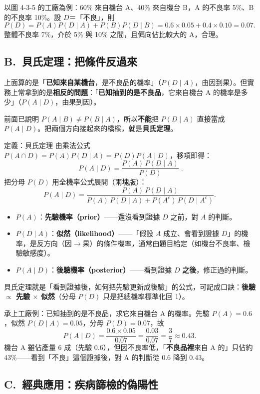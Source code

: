 \documentclass[11pt]{article}
\begin{document}
以圖 4-3-5 的工廠為例：60\% 來自機台 A、40\% 來自機台 B，A 的不良率 5\%、B 的不良率 10\%。設 $D$＝「不良」，則
$$P(D)=P(A)P(D\mid A)+P(B)P(D\mid B)=0.6\times0.05+0.4\times0.10=0.07.$$
整體不良率 7\%，介於 5\% 與 10\% 之間，且偏向佔比較大的 A，合理。

\subsection*{\sffamily B.\ 貝氏定理：把條件反過來}

上面算的是「\textbf{已知來自某機台}，是不良品的機率」（$P(D\mid A)$，由因到果）。但實務上常拿到的是\textbf{相反的問題}：「\textbf{已知抽到的是不良品}，它來自機台 A 的機率是多少」（$P(A\mid D)$，由果到因）。

前面已說明 $P(A\mid B)\neq P(B\mid A)$，所以\textbf{不能}把 $P(D\mid A)$ 直接當成 $P(A\mid D)$。把兩個方向接起來的橋樑，就是\textbf{貝氏定理}。

\begin{補充框}{定義：貝氏定理}
由乘法公式 $P(A\cap D)=P(A)P(D\mid A)=P(D)P(A\mid D)$，移項即得：
$$\boxed{\;P(A\mid D)=\frac{P(A)\,P(D\mid A)}{P(D)}\;}.$$
把分母 $P(D)$ 用全機率公式展開（兩塊版）：
$$P(A\mid D)=\frac{P(A)\,P(D\mid A)}{P(A)\,P(D\mid A)+P(A^c)\,P(D\mid A^c)}.$$
\begin{itemize}\setlength{\itemsep}{1pt}
\item $P(A)$：\textbf{先驗機率（prior）}——還沒看到證據 $D$ 之前，對 $A$ 的判斷。
\item $P(D\mid A)$：\textbf{似然（likelihood）}——「假設 $A$ 成立、會看到證據 $D$」的機率，是反方向（因$\rightarrow$果）的條件機率，通常由題目給定（如機台不良率、檢驗敏感度）。
\item $P(A\mid D)$：\textbf{後驗機率（posterior）}——看到證據 $D$ \textbf{之後}，修正過的判斷。
\end{itemize}
貝氏定理就是「看到證據後，如何把先驗更新成後驗」的公式，可記成口訣：\textbf{後驗 $\propto$ 先驗 $\times$ 似然}（分母 $P(D)$ 只是把總機率標準化回 1）。
\end{補充框}

承上工廠例：已知抽到的是不良品，求它來自機台 A 的機率。先驗 $P(A)=0.6$，似然 $P(D\mid A)=0.05$，分母 $P(D)=0.07$，故
$$P(A\mid D)=\frac{0.6\times0.05}{0.07}=\frac{0.03}{0.07}=\frac37\approx0.43.$$
機台 A 雖佔產量 6 成（先驗 0.6），但因不良率低，「\textbf{不良品裡}來自 A 的」只佔約 43\%——看到「不良」這個證據後，對 A 的判斷從 0.6 降到 0.43。

\subsection*{\sffamily C.\ 經典應用：疾病篩檢的偽陽性}
\end{document}
